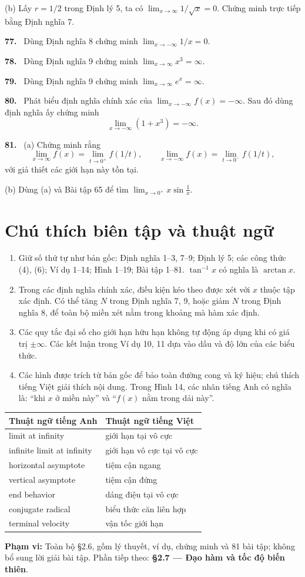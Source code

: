 \documentclass[12pt,a4paper]{article}
\newcommand{\bt}[1]{\par\smallskip\noindent\textbf{#1.}\ }
\begin{document}
(b) Lấy $r=1/2$ trong Định lý 5, ta có $\lim_{x\to\infty}1/\sqrt{x}=0$. Chứng minh trực tiếp bằng Định nghĩa 7.
\bt{77} Dùng Định nghĩa 8 chứng minh $\lim_{x\to-\infty}1/x=0$.
\bt{78} Dùng Định nghĩa 9 chứng minh $\lim_{x\to\infty}x^3=\infty$.
\bt{79} Dùng Định nghĩa 9 chứng minh $\lim_{x\to\infty}e^x=\infty$.
\bt{80} Phát biểu định nghĩa chính xác của $\lim_{x\to-\infty}f(x)=-\infty$. Sau đó dùng định nghĩa ấy chứng minh
\[\lim_{x\to-\infty}(1+x^3)=-\infty.\]
\bt{81} (a) Chứng minh rằng
\[\lim_{x\to\infty}f(x)=\lim_{t\to0^+}f(1/t),\qquad\lim_{x\to-\infty}f(x)=\lim_{t\to0^-}f(1/t),\]
với giả thiết các giới hạn này tồn tại.

(b) Dùng (a) và Bài tập 65 để tìm $\displaystyle\lim_{x\to0^+}x\sin\frac1x$.
\section*{Chú thích biên tập và thuật ngữ}
\begin{enumerate}
\item Giữ số thứ tự như bản gốc: Định nghĩa 1–3, 7–9; Định lý 5; các công thức (4), (6); Ví dụ 1–14; Hình 1–19; Bài tập 1–81. $\tan^{-1}x$ có nghĩa là $\arctan x$.
\item Trong các định nghĩa chính xác, điều kiện kéo theo được xét với $x$ thuộc tập xác định. Có thể tăng $N$ trong Định nghĩa 7, 9, hoặc giảm $N$ trong Định nghĩa 8, để toàn bộ miền xét nằm trong khoảng mà hàm xác định.
\item Các quy tắc đại số cho giới hạn hữu hạn không tự động áp dụng khi có giá trị $\pm\infty$. Các kết luận trong Ví dụ 10, 11 dựa vào dấu và độ lớn của các biểu thức.
\item Các hình được trích từ bản gốc để bảo toàn đường cong và ký hiệu; chú thích tiếng Việt giải thích nội dung. Trong Hình 14, các nhãn tiếng Anh có nghĩa là: “khi $x$ ở miền này” và “$f(x)$ nằm trong dải này”.
\end{enumerate}
\begin{center}\begin{tabular}{ll}\toprule Thuật ngữ tiếng Anh&Thuật ngữ tiếng Việt\\\midrule
limit at infinity&giới hạn tại vô cực\\
infinite limit at infinity&giới hạn vô cực tại vô cực\\
horizontal asymptote&tiệm cận ngang\\
vertical asymptote&tiệm cận đứng\\
end behavior&dáng điệu tại vô cực\\
conjugate radical&biểu thức căn liên hợp\\
terminal velocity&vận tốc giới hạn\\\bottomrule
\end{tabular}\end{center}
\noindent\textbf{Phạm vi:} Toàn bộ §2.6, gồm lý thuyết, ví dụ, chứng minh và 81 bài tập; không bổ sung lời giải bài tập. Phần tiếp theo: \textbf{§2.7 — Đạo hàm và tốc độ biến thiên}.
\end{document}
